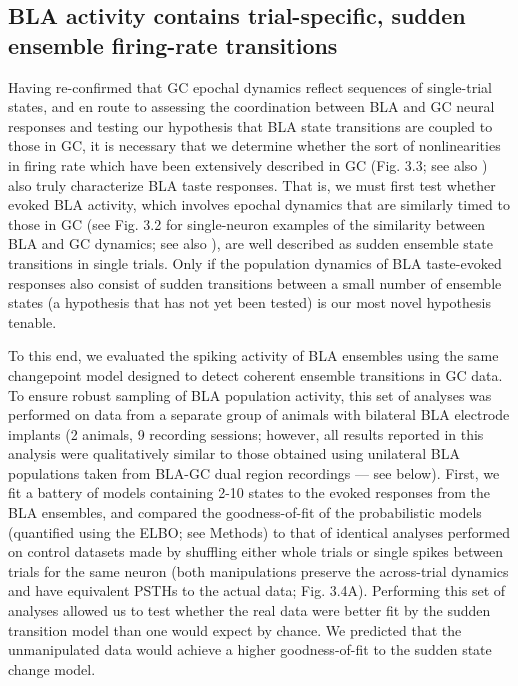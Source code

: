 \begin{refsection}
\subsection{BLA activity contains trial-specific, sudden ensemble firing-rate transitions}
Having re-confirmed that GC epochal dynamics reflect sequences of single-trial states, and en route to assessing the coordination between BLA and GC neural responses and testing our hypothesis that BLA state transitions are coupled to those in GC, it is necessary that we determine whether the sort of nonlinearities in firing rate which have been extensively described in GC (Fig. 3.3; see also \cite{jones2007a,sadacca2016a}) also truly characterize BLA taste responses. That is, we must first test whether evoked BLA activity, which involves epochal dynamics that are similarly timed to those in GC (see Fig. 3.2 for single-neuron examples of the similarity between BLA and GC dynamics; see also \cite{fontanini2009a}), are well described as sudden ensemble state transitions in single trials. Only if the population dynamics of BLA taste-evoked responses also consist of sudden transitions between a small number of ensemble states (a hypothesis that has not yet been tested) is our most novel hypothesis tenable.

To this end, we evaluated the spiking activity of BLA ensembles using the same changepoint model designed to detect coherent ensemble transitions in GC data. To ensure robust sampling of BLA population activity, this set of analyses was performed on data from a separate group of animals with bilateral BLA electrode implants (2 animals, 9 recording sessions; however, all results reported in this analysis were qualitatively similar to those obtained using unilateral BLA populations taken from BLA-GC dual region recordings --- see below). First, we fit a battery of models containing 2-10 states to the evoked responses from the BLA ensembles, and compared the goodness-of-fit of the probabilistic models (quantified using the ELBO; see Methods) to that of identical analyses performed on control datasets made by shuffling either whole trials or single spikes between trials for the same neuron (both manipulations preserve the across-trial dynamics and have equivalent PSTHs to the actual data; Fig. 3.4A). Performing this set of analyses allowed us to test whether the real data were better fit by the sudden transition model than one would expect by chance. We predicted that the unmanipulated data would achieve a higher goodness-of-fit to the sudden state change model.


\end{refsection}
